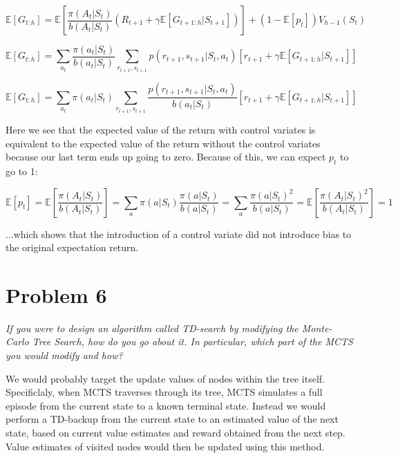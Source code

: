 \documentclass{article}
\begin{document}
\begin{equation}
    \mathbb{E}[G_{t:h}] = \mathbb{E}[\frac{\pi(A_t|S_t)}{b(A_t|S_t)}(R_{t+1} + \gamma \mathbb{E}[G_{t+1:h}|S_{t+1}])] + (1-\mathbb{E}[p_t]) V_{h-1} (S_t)
\end{equation}

\begin{equation}
    \mathbb{E}[G_{t:h}] = \sum_{a_t}\frac{\pi(a_t|S_t)}{b(a_t|S_t)}\sum_{r_{t+1},s_{t+1}}p(r_{t+1},s_{t+1}|S_t,a_t)[r_{t+1} + \gamma \mathbb{E}[G_{t+1:h}|S_{t+1}]]
\end{equation}

\begin{equation}
    \mathbb{E}[G_{t:h}] = \sum_{a_t}\pi(a_t|S_t)\sum_{r_{t+1},s_{t+1}}\frac{p(r_{t+1},s_{t+1}|S_t,a_t)}{b(a_t|S_t)}[r_{t+1} + \gamma \mathbb{E}[G_{t+1:h}|S_{t+1}]]
\end{equation}

Here we see that the expected value of the return with control variates is equivalent to the expected value of the return without the control variates because our last term ends up going to zero. Because of this, we can expect $p_t$ to go to 1:

\begin{equation}
    \mathbb{E}[p_t] = \mathbb{E}\left[\frac{\pi(A_t|S_t)}{b(A_t|S_t)}\right]
    = \sum_{a}\pi(a|S_t)\frac{\pi(a|S_t)}{b(a|S_t)}
    = \sum_{a}\frac{\pi(a|S_t)^2}{b(a|S_t)}
    = \mathbb{E}\left[\frac{\pi(A_t|S_t)^2}{b(A_t|S_t)}\right]
    = 1
\end{equation}

...which shows that the introduction of a control variate did not introduce bias to the original expectation return.


\section*{Problem 6}

\textit{If you were to design an algorithm called TD-search by modifying the Monte-Carlo Tree Search, how do you go about it. In particular, which part of the MCTS you would modify and how?}

We would probably target the update values of nodes within the tree itself. Specificlaly, when MCTS traverses through its tree, MCTS simulates a full episode from the current state to a known terminal state. Instead we would perform a TD-backup from the current state to an estimated value of the next state, based on current value estimates and reward obtained from the next step. Value estimates of visited nodes would then be updated using this method.
\end{document}
